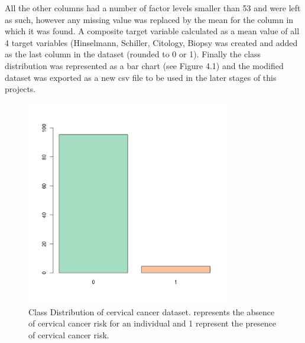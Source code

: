 All the other columns had a number of factor levels smaller than 53 and were left as such, however any missing value was replaced by the mean for the column in which it was found.
A composite target variable calculated as a mean value of all 4 target variables (Hinselmann, Schiller, Citology, Biopsy was created and added as the last column in the dataset (rounded to 0 or 1).
Finally the class distribution was represented as a bar chart (see Figure 4.1) and the modified dataset was exported as a new csv file to be used in the later stages of this projects.

\begin{figure}[H]
    \centering
    \includegraphics[width=0.8\textwidth]{ThesisTemplate/usingLatex/chapter4Images/figure4_10.png}
    \caption{Class Distribution of cervical cancer dataset. represents the absence of cervical cancer risk for an individual and 1 represent the presence of cervical cancer risk.}
    \label{fig:my_label}
\end{figure}


